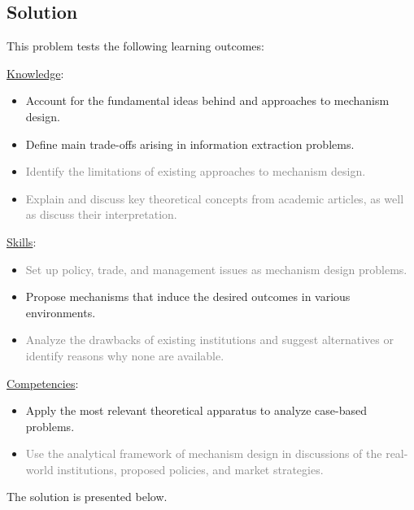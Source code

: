 \documentclass[a4paper]{article}
\newif\ifsolutions
\begin{document}
	
	
\ifsolutions
\subsection*{Solution}
	This problem tests the following learning outcomes:
	\begin{framed}
		\underline{Knowledge}:
		\begin{itemize}[$\circ$]
			\item {Account for the fundamental ideas behind and approaches to mechanism design.}
			\item {Define main trade-offs arising in information extraction problems.}
			\item \textcolor{gray}{Identify the limitations of existing approaches to mechanism design.}
			\item \textcolor{gray}{Explain and discuss key theoretical concepts from academic articles, as well as discuss their interpretation.}
		\end{itemize}
		\underline{Skills}:
		\begin{itemize}[$\circ$]
			\item \textcolor{gray}{Set up policy, trade, and management issues as mechanism design problems.}
			\item {Propose mechanisms that induce the desired outcomes in various environments.}
			\item \textcolor{gray}{Analyze the drawbacks of existing institutions and suggest alternatives or identify reasons why none are available.}
		\end{itemize}
		\underline{Competencies}:
		\begin{itemize}[$\circ$]
			\item {Apply the most relevant theoretical apparatus to analyze case-based problems.}
			\item \textcolor{gray}{Use the analytical framework of mechanism design in discussions of the real-world institutions, proposed policies, and market strategies.}
		\end{itemize}
	\end{framed}

	The solution is presented below.
\end{document}
